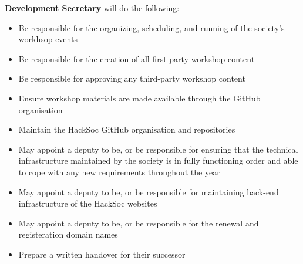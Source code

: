 \begin{subclause}
  \textbf{Development Secretary} will do the following: 
  \begin{itemize}[label=--]
    \item Be responsible for the organizing, scheduling, and running of the society's workhsop events
    \item Be responsible for the creation of all first-party workshop content
    \item Be responsible for approving any third-party workshop content
    \item Ensure workshop materials are made available through the GitHub organisation
    \item Maintain the HackSoc GitHub organisation and repositories
    \item May appoint a deputy to be, or be responsible for ensuring that the technical infrastructure maintained by the society is in fully functioning order and able to cope with any new requirements throughout the year
    \item May appoint a deputy to be, or be responsible for maintaining back-end infrastructure of the HackSoc websites
    \item May appoint a deputy to be, or be responsible for the renewal and registeration domain names
    \item Prepare a written handover for their successor
  \end{itemize}
\end{subclause}
